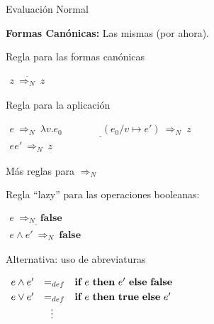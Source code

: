 \documentclass[handout]{beamer}
\begin{document}


\begin{frame}{Evaluación Normal}

\textbf{Formas Canónicas:} Las mismas (por ahora). 

\bigskip

Regla para las formas canónicas

\bigskip

$\begin{array}{c}
\overline{z\ \Rightarrow_N\ z}
\end{array}
$

\bigskip

\medskip

Regla para la aplicación

\bigskip


$\begin{array}{c}
\underline{e\ \Rightarrow_N\ \lambda v.e_0\qquad \qquad(e_0/v\mapsto e')\ \Rightarrow_N\ z}\\
ee'\ \Rightarrow_N\ z
\end{array}
$
\end{frame}


\begin{frame}{Más reglas para $\Rightarrow_N$}

Regla ``lazy'' para las operaciones booleanas:

\bigskip

$\begin{array}{c}
\underline{e\ \Rightarrow_N\ \textbf{false}}\\
e\wedge e'\ \Rightarrow_N\ \textbf{false}
\end{array}
$ \pause


\bigskip

\bigskip


Alternativa: uso de abreviaturas 

\bigskip

$\begin{array}{lll}
e\wedge e' & =_{def}&  \textbf{if}\ e\ \textbf{then}\ e'\  \textbf{else}\ \textbf{false}\ \smallskip\\
e\vee e' & =_{def}&  \textbf{if}\ e\ \textbf{then}\ \textbf{true}\  \textbf{else}\ e' \\
&\ \ \vdots 
\end{array}
$


\end{frame}


\end{document}

